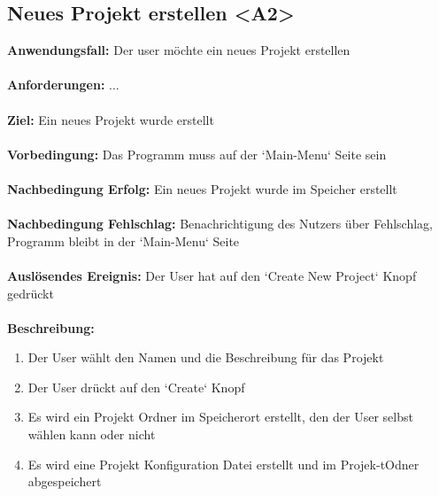 \documentclass[parskip=full]{scrartcl} %
\begin{document}
\subsection*{Neues Projekt erstellen <A2>}
\textbf{Anwendungsfall:} Der user möchte ein neues Projekt erstellen\\\\
\textbf{Anforderungen:} ...\\\\
\textbf{Ziel:} Ein neues Projekt wurde erstellt \\\\
\textbf{Vorbedingung:} Das Programm muss auf der `Main-Menu` Seite sein   \\\\
\textbf{Nachbedingung Erfolg:} Ein neues Projekt wurde im Speicher erstellt  \\\\
\textbf{Nachbedingung Fehlschlag:} Benachrichtigung des Nutzers über Fehlschlag, Programm  bleibt in der `Main-Menu` Seite \\\\
\textbf{Auslösendes Ereignis:} Der User hat auf den `Create New Project` Knopf gedrückt \\\\
\textbf{Beschreibung:}
\begin{enumerate}
    \item Der User wählt den Namen und die Beschreibung für das Projekt
    \item Der User drückt auf den `Create` Knopf
    \item Es wird ein Projekt Ordner im Speicherort erstellt, den der User selbst wählen kann oder nicht
    \item Es wird eine Projekt Konfiguration Datei erstellt und im Projek-tOdner abgespeichert
\end{enumerate}
\newpage
\end{document}
